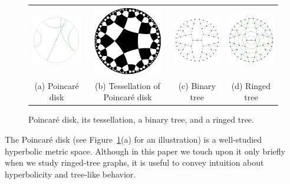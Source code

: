 \documentclass[11pt]{article}
\begin{document}
\begin{figure}
   \begin{center}
	\begin{tabular}{cccc}
         \includegraphics[height=1.2in]{poincare.jpg} &
         \includegraphics[height=1.2in]{tess-5-4-bw.jpg} &
         \includegraphics[height=1.2in]{binary-tree-v1.jpg} &
         \includegraphics[height=1.2in]{ringed-tree-v1.jpg} \\
	(a) Poincar\'{e} disk &
	(b) \parbox[t]{0.8in}{Tessellation of Poincar\'{e} disk} &
	(c) Binary tree &
	(d) Ringed tree 
	\end{tabular}
   \end{center}
\caption{ Poincar\'{e} disk, its tessellation, a binary tree, 
	and a ringed tree.
}
\label{fig:disk}
\end{figure}


The Poincar\'{e} disk (see Figure~\ref{fig:disk}(a) for an illustration) is 
a well-studied hyperbolic metric space.
Although in this paper we touch upon it only briefly when we study 
ringed-tree graphs, it is useful to convey intuition about hyperbolicity and
tree-like behavior.
\end{document}
